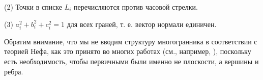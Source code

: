 \documentclass[a4paper,12pt, titlepage]{article}
\begin{document}
\begin{flushleft}
 (2) Точки в списке $L_{i}$ перечисляются против часовой стрелки.
\end{flushleft}

\begin{flushleft}
 (3) $a_{i}^{2} + b_{i}^{2} + c_{i}^{2} = 1$ для всех граней, т. е. вектор нормали единичен.
\end{flushleft}

\begin{flushleft}
 Обратим внимание, что мы не вводим структуру многогранника в соответствии с теорией Нефа, как это принято во
многих работах (см., например, \cite{Nef78, BN88, DMY93}), поскольку есть необходимость, чтобы первичными были 
именно не плоскости, а вершины и ребра.
\end{flushleft}
\end{document}
